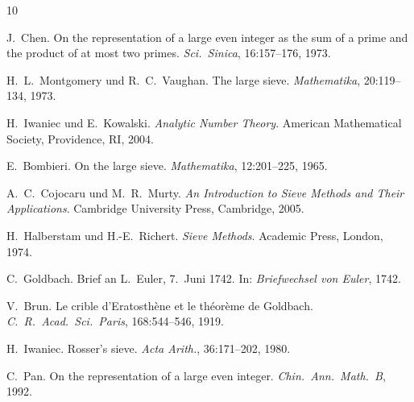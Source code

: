 \documentclass[12pt,a4paper]{amsart}
\theoremstyle{definition}
\begin{document}
\begin{thebibliography}{10}

J.~Chen.
\newblock On the representation of a large even integer as the sum of a prime
  and the product of at most two primes.
\newblock \emph{Sci.\ Sinica}, 16:157--176, 1973.

H.~L.~Montgomery und R.~C.~Vaughan.
\newblock The large sieve.
\newblock \emph{Mathematika}, 20:119--134, 1973.

H.~Iwaniec und E.~Kowalski.
\newblock \emph{Analytic Number Theory}.
\newblock American Mathematical Society, Providence, RI, 2004.

E.~Bombieri.
\newblock On the large sieve.
\newblock \emph{Mathematika}, 12:201--225, 1965.

A.~C.~Cojocaru und M.~R.~Murty.
\newblock \emph{An Introduction to Sieve Methods and Their Applications}.
\newblock Cambridge University Press, Cambridge, 2005.

H.~Halberstam und H.-E.~Richert.
\newblock \emph{Sieve Methods}.
\newblock Academic Press, London, 1974.

C.~Goldbach.
\newblock Brief an L.~Euler, 7.~Juni 1742.
\newblock In: \emph{Briefwechsel von Euler}, 1742.

V.~Brun.
\newblock Le crible d'Eratosth\`{e}ne et le th\'{e}or\`{e}me de Goldbach.
\newblock \emph{C.\ R.\ Acad.\ Sci.\ Paris}, 168:544--546, 1919.

H.~Iwaniec.
\newblock Rosser's sieve.
\newblock \emph{Acta Arith.}, 36:171--202, 1980.

C.~Pan.
\newblock On the representation of a large even integer.
\newblock \emph{Chin.\ Ann.\ Math.\ B}, 1992.

\end{thebibliography}
\end{document}
